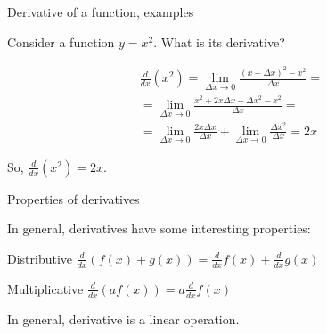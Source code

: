 \documentclass{beamer}
\begin{document}
\begin{frame}{Derivative of a function, examples}
	\begin{flushleft}
		
		Consider a function $y = x^2$. What is its derivative?
		
		\begin{align*}
			\frac{d}{dx}  (x^2) = \underset{\Delta x \to 0}{\lim} \frac{(x + \Delta x)^2 - x^2}{\Delta x} = \\
			=\underset{\Delta x \to 0}{\lim} \frac{x^2 + 2 x  \Delta x+ \Delta x^2 - x^2}{\Delta x} = \\ 
			=\underset{\Delta x \to 0}{\lim} \frac{2 x  \Delta x}{\Delta x} + 
			\underset{\Delta x \to 0}{\lim} \frac{\Delta x^2}{\Delta x} = 2 x
		\end{align*}
		
		So, $\frac{d}{dx}  (x^2)  = 2x$.
		
	\end{flushleft}
\end{frame}








\begin{frame}{Properties of derivatives}
	\begin{flushleft}
		
		In general, derivatives have some interesting properties:
		
		\begin{block}{Distributive}
			$\frac{d}{dx} (f(x) + g(x)) = \frac{d}{dx} f(x) + \frac{d}{dx} g(x)$
		\end{block}
		\begin{block}{Multiplicative}
			$\frac{d}{dx} (a f(x) ) = a \frac{d}{dx} f(x) $
		\end{block}
	
		\bigskip
	
		In general, derivative is a linear operation.
		
	\end{flushleft}
\end{frame}
\end{document}
